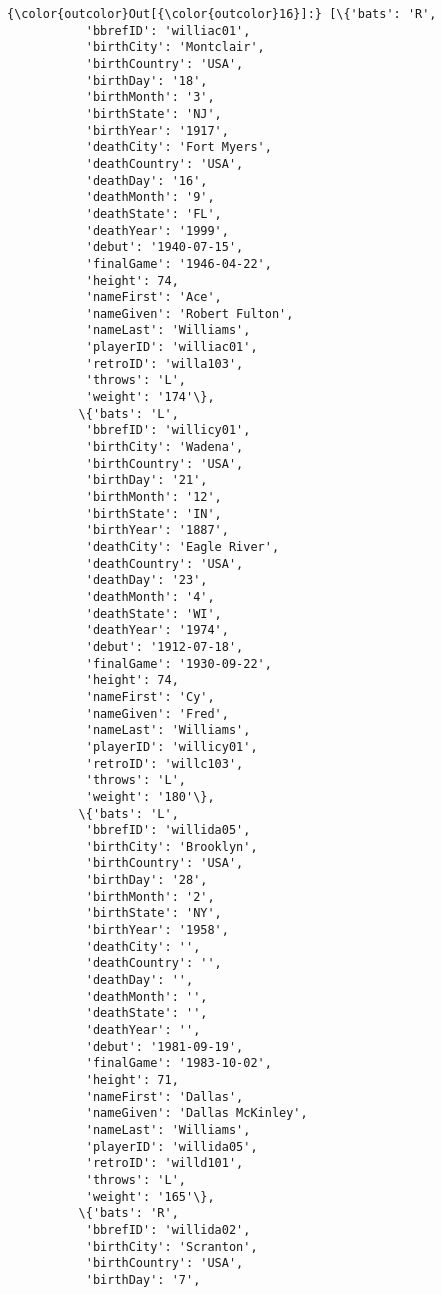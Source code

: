\documentclass[11pt]{article}
\begin{document}
\begin{Verbatim}[commandchars=\\\{\}]
{\color{outcolor}Out[{\color{outcolor}16}]:} [\{'bats': 'R',
           'bbrefID': 'williac01',
           'birthCity': 'Montclair',
           'birthCountry': 'USA',
           'birthDay': '18',
           'birthMonth': '3',
           'birthState': 'NJ',
           'birthYear': '1917',
           'deathCity': 'Fort Myers',
           'deathCountry': 'USA',
           'deathDay': '16',
           'deathMonth': '9',
           'deathState': 'FL',
           'deathYear': '1999',
           'debut': '1940-07-15',
           'finalGame': '1946-04-22',
           'height': 74,
           'nameFirst': 'Ace',
           'nameGiven': 'Robert Fulton',
           'nameLast': 'Williams',
           'playerID': 'williac01',
           'retroID': 'willa103',
           'throws': 'L',
           'weight': '174'\},
          \{'bats': 'L',
           'bbrefID': 'willicy01',
           'birthCity': 'Wadena',
           'birthCountry': 'USA',
           'birthDay': '21',
           'birthMonth': '12',
           'birthState': 'IN',
           'birthYear': '1887',
           'deathCity': 'Eagle River',
           'deathCountry': 'USA',
           'deathDay': '23',
           'deathMonth': '4',
           'deathState': 'WI',
           'deathYear': '1974',
           'debut': '1912-07-18',
           'finalGame': '1930-09-22',
           'height': 74,
           'nameFirst': 'Cy',
           'nameGiven': 'Fred',
           'nameLast': 'Williams',
           'playerID': 'willicy01',
           'retroID': 'willc103',
           'throws': 'L',
           'weight': '180'\},
          \{'bats': 'L',
           'bbrefID': 'willida05',
           'birthCity': 'Brooklyn',
           'birthCountry': 'USA',
           'birthDay': '28',
           'birthMonth': '2',
           'birthState': 'NY',
           'birthYear': '1958',
           'deathCity': '',
           'deathCountry': '',
           'deathDay': '',
           'deathMonth': '',
           'deathState': '',
           'deathYear': '',
           'debut': '1981-09-19',
           'finalGame': '1983-10-02',
           'height': 71,
           'nameFirst': 'Dallas',
           'nameGiven': 'Dallas McKinley',
           'nameLast': 'Williams',
           'playerID': 'willida05',
           'retroID': 'willd101',
           'throws': 'L',
           'weight': '165'\},
          \{'bats': 'R',
           'bbrefID': 'willida02',
           'birthCity': 'Scranton',
           'birthCountry': 'USA',
           'birthDay': '7',

\end{Verbatim}
\end{document}
